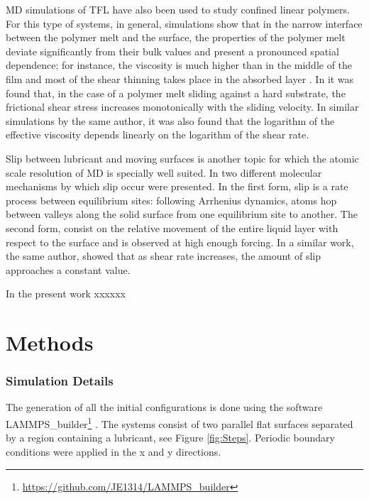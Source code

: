 \documentclass[aps,prb,reprint,superscriptaddress, a4paper]{revtex4-1}
\begin{document}
MD simulations of TFL have also been used to study confined linear polymers. For this type of systems, in general,  simulations show that in the narrow interface between  the polymer melt and the surface,  the properties  of the polymer melt deviate significantly from their  bulk values and present a pronounced spatial dependence\cite{Bitsanis1990}; for instance, the viscosity  is much higher than in the middle of the film and most of the shear thinning takes place in the absorbed layer \cite{Manias1996}. In \cite{Sivebaek2010} it was found that, in the case of a polymer melt sliding against a hard substrate, the  frictional shear stress increases monotonically with the sliding velocity. In similar simulations by the same author\cite{Sivebaek2012}, it was also found that the logarithm of the effective viscosity depends linearly on the logarithm of the shear rate. 

Slip between lubricant and moving surfaces is another topic for which the atomic scale resolution of MD is specially well suited. In   \cite{MARTINI2008} two different molecular mechanisms by which slip occur were presented.  In the first form, slip is a rate process between equilibrium sites: following Arrhenius dynamics, atoms hop between valleys along the solid surface from one equilibrium site to another. The second form, consist on the relative movement of the entire liquid layer with respect to the surface  and  is observed at high enough forcing. In a similar work, the same author\cite{Martini2008a},  showed that as shear rate increases, the amount of slip approaches  a constant value.



In the present work xxxxxx



\section{Methods}

\subsubsection{Simulation Details}

The generation of all the initial configurations is done using the software LAMMPS\_builder\footnote{\url{https://github.com/JE1314/LAMMPS_builder}} \cite{Ewen2017b,Jewett2013,HjorthLarsen2017}. The systems consist of two parallel flat surfaces separated by a region containing a lubricant, see Figure \ref{fig:Steps}. Periodic boundary conditions were applied in the x and y directions.
\end{document}
